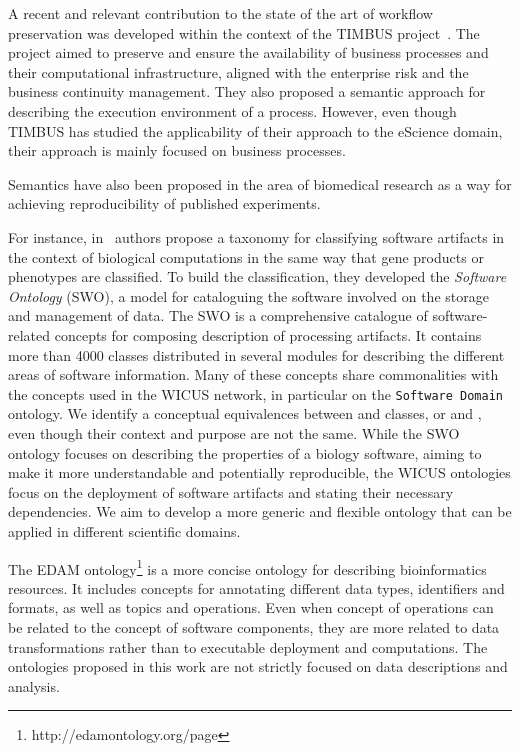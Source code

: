 A recent and relevant contribution to the state of the art of workflow preservation was developed within the context of the TIMBUS project~\cite{Mayer2014Ontologies}. The project  aimed to preserve and ensure the availability of business processes and their computational infrastructure, aligned with the enterprise risk and the business continuity management. They also proposed a semantic approach for describing the execution environment of a process.  However, even though TIMBUS has studied the applicability of their approach to the eScience domain, their approach is mainly focused on business processes.

Semantics have also been proposed in the area of biomedical research 
as a way for achieving reproducibility of published experiments. 

For instance, in~\cite{MaloneSWO2014} authors propose a taxonomy for 
classifying software artifacts in the context of biological computations in 
the same way that gene products or phenotypes are classified. To build the
classification, they developed the {\it Software Ontology} (SWO), a model 
for cataloguing the software involved on the storage and management of data.
The SWO is a comprehensive catalogue of software-related concepts for 
composing description of processing artifacts. It contains more than 4000 
classes distributed in several modules for describing the different areas of 
software information. Many of these concepts share commonalities with the 
concepts used in the WICUS network, in particular on the \texttt{Software 
Domain} ontology. We identify a conceptual equivalences between 
 and  classes, or 
 and , even though their 
context and purpose are not the same. While the SWO ontology focuses 
on describing the properties of a biology software, aiming to make it more 
understandable and potentially reproducible, the WICUS ontologies focus 
on the deployment of software artifacts and stating their necessary 
dependencies. We aim to develop a more generic and flexible ontology 
that can be applied in different scientific domains.

The EDAM ontology\footnote{http://edamontology.org/page} is a more 
concise ontology for describing bioinformatics resources. It includes concepts 
for annotating different data types, identifiers and formats, as well as topics 
and operations. Even when concept of operations can be related to the 
concept of software components, they are more related to data 
transformations rather than to executable deployment and computations.
The ontologies proposed in this work are not strictly focused on data 
descriptions and analysis.



